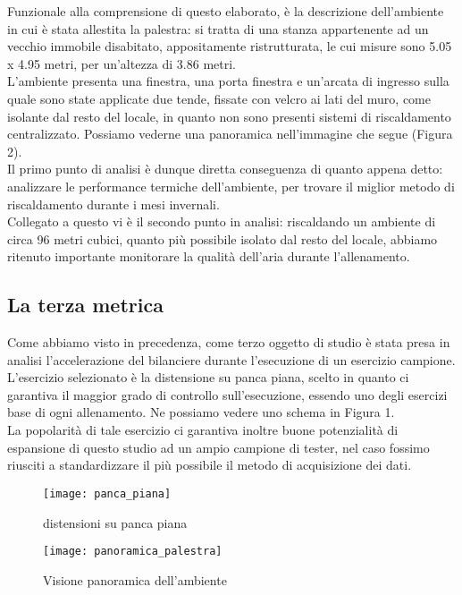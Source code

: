 \documentclass[fleqn,10pt]{SelfArx} %
\begin{document}
Funzionale alla comprensione di questo elaborato, è la descrizione dell'ambiente in cui è stata allestita 
la palestra: si tratta di una stanza appartenente ad un vecchio immobile disabitato, appositamente 
ristrutturata, le cui misure sono 5.05 x 4.95 metri, per un'altezza di 3.86 metri. \\

L'ambiente presenta una finestra, una porta finestra e un'arcata di ingresso sulla quale sono state applicate 
due tende, fissate con velcro ai lati del muro, come isolante dal resto del locale, in quanto non 
sono presenti sistemi di riscaldamento centralizzato. Possiamo vederne una panoramica nell'immagine che segue 
(Figura 2). \\

Il primo punto di analisi è dunque diretta conseguenza di quanto appena detto: analizzare le performance 
termiche dell'ambiente, per trovare il miglior metodo di riscaldamento durante i mesi invernali.\\
Collegato a questo vi è il secondo punto in analisi: riscaldando un ambiente di circa 96 metri cubici, quanto 
più possibile isolato dal resto del locale, abbiamo ritenuto importante monitorare la qualità dell'aria 
durante l'allenamento.

\subsection{La terza metrica}
Come abbiamo visto in precedenza, come terzo oggetto di studio è stata presa in analisi l'accelerazione del bilanciere 
durante l'esecuzione di un esercizio campione.\\
L'esercizio selezionato è la distensione su panca piana, scelto in quanto ci garantiva il maggior grado di controllo 
sull'esecuzione, essendo uno degli esercizi base di ogni allenamento. Ne possiamo vedere uno schema in Figura 1.\\

La popolarità di tale esercizio ci garantiva inoltre buone potenzialità di espansione di questo studio ad un 
ampio campione di tester, nel caso fossimo riusciti a standardizzare il più possibile il metodo di acquisizione dei dati.

\begin{figure}[htb!]\centering
	\texttt{[image: panca\_piana]}
	\caption{distensioni su panca piana}
	\label{fig:panca_piana}
\end{figure}

\begin{figure*}[ht]\centering %
	\texttt{[image: panoramica\_palestra]}
	\caption{Visione panoramica dell'ambiente}
	\label{fig:view}
\end{figure*}
\end{document}
